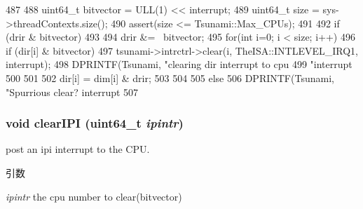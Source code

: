\begin{DoxyCode}
487 {
488     uint64_t bitvector = ULL(1) << interrupt;
489     uint64_t size = sys->threadContexts.size();
490     assert(size <= Tsunami::Max_CPUs);
491 
492     if (drir & bitvector)
493     {
494         drir &= ~bitvector;
495         for(int i=0; i < size; i++) {
496            if (dir[i] & bitvector) {
497                tsunami->intrctrl->clear(i, TheISA::INTLEVEL_IRQ1, interrupt);
498                DPRINTF(Tsunami, "clearing dir interrupt to cpu %
499                     "interrupt %
500 
501            }
502            dir[i] = dim[i] & drir;
503         }
504     }
505     else
506         DPRINTF(Tsunami, "Spurrious clear? interrupt %
507 }
\end{DoxyCode}
\hypertarget{classTsunamiCChip_ad463cf06091847c5eef7aba24419eee0}{
\subsubsection[{clearIPI}]{\setlength{\rightskip}{0pt plus 5cm}void clearIPI (uint64\_\-t {\em ipintr})}}
\label{classTsunamiCChip_ad463cf06091847c5eef7aba24419eee0}
post an ipi interrupt to the CPU. 
\begin{DoxyParams}{引数}
\item[{\em ipintr}]the cpu number to clear(bitvector) \end{DoxyParams}



